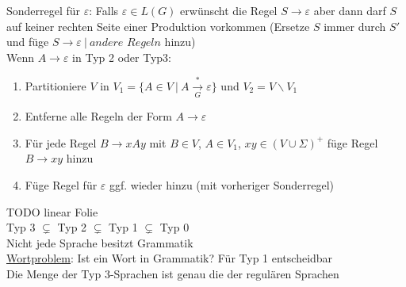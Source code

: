 \documentclass[a4paper]{article}
\newcommand{\ul}{\underline}
\let\epsilon\varepsilon
\begin{document}
Sonderregel für $\epsilon$: Falls $\epsilon\in L(G)$ erwünscht die Regel $S\rightarrow\epsilon$ aber dann darf $S$ auf keiner rechten Seite einer Produktion vorkommen (Ersetze $S$ immer durch $S'$ und füge $S\rightarrow\epsilon\ \vert\ \textit{andere Regeln}$ hinzu)\\
Wenn $A\rightarrow\epsilon$ in Typ 2 oder Typ3:
\begin{enumerate}[1.]
	\item Partitioniere $V$ in $V_1=\{A\in V\ \vert\ A\overset{*}{\underset{G}{\rightarrow}}\epsilon\}$ und $V_2=V\backslash V_1$
	\item Entferne alle Regeln der Form $A\rightarrow\epsilon$
	\item Für jede Regel $B\rightarrow xAy$ mit $B\in V$, $A\in V_1$, $xy\in (V\cup\Sigma)^+$ füge Regel $B\rightarrow xy$ hinzu
	\item Füge Regel für $\epsilon$ ggf. wieder hinzu (mit vorheriger Sonderregel)
\end{enumerate}
TODO linear Folie\\
Typ 3 $\subsetneq$ Typ 2 $\subsetneq$ Typ 1 $\subsetneq$ Typ 0\\
Nicht jede Sprache besitzt Grammatik\\
\ul{Wortproblem}: Ist ein Wort in Grammatik? Für Typ 1 entscheidbar\\
Die Menge der Typ 3-Sprachen ist genau die der regulären Sprachen
\end{document}
